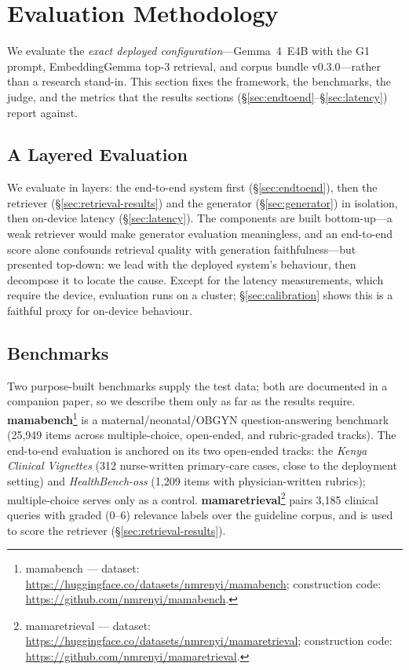 \section{Evaluation Methodology}
\label{sec:methodology}

We evaluate the \emph{exact deployed configuration}---Gemma~4~E4B with the G1
prompt, EmbeddingGemma top-3 retrieval, and corpus bundle v0.3.0---rather
than a research stand-in. This section fixes the framework, the benchmarks,
the judge, and the metrics that the results sections
(\S\ref{sec:endtoend}--\S\ref{sec:latency}) report against.

\subsection{A Layered Evaluation}

We evaluate in layers: the end-to-end system first (\S\ref{sec:endtoend}),
then the retriever (\S\ref{sec:retrieval-results}) and the generator
(\S\ref{sec:generator}) in isolation, then on-device latency
(\S\ref{sec:latency}). The components are built bottom-up---a weak retriever
would make generator evaluation meaningless, and an end-to-end score alone
confounds retrieval quality with generation faithfulness---but presented
top-down: we lead with the deployed system's behaviour, then decompose it to
locate the cause. Except for the latency measurements, which require the
device, evaluation runs on a cluster; \S\ref{sec:calibration} shows this is a
faithful proxy for on-device behaviour.

\subsection{Benchmarks}

Two purpose-built benchmarks supply the test data; both are documented in a
companion paper, so we describe them only as far as the results require.
\textbf{mamabench}\footnote{mamabench --- dataset:
\url{https://huggingface.co/datasets/nmrenyi/mamabench}; construction code:
\url{https://github.com/nmrenyi/mamabench}.} is a maternal/neonatal/OBGYN
question-answering benchmark (25{,}949 items across multiple-choice,
open-ended, and rubric-graded tracks). The end-to-end evaluation is anchored on its two open-ended tracks:
the \emph{Kenya Clinical Vignettes} (312 nurse-written primary-care cases,
close to the deployment setting) and \emph{HealthBench-oss} (1{,}209 items
with physician-written rubrics); multiple-choice serves only as a control.
\textbf{mamaretrieval}\footnote{mamaretrieval --- dataset:
\url{https://huggingface.co/datasets/nmrenyi/mamaretrieval}; construction
code: \url{https://github.com/nmrenyi/mamaretrieval}.} pairs 3{,}185 clinical
queries with graded ($0$--$6$) relevance labels over the guideline corpus,
and is used to score the retriever (\S\ref{sec:retrieval-results}).

